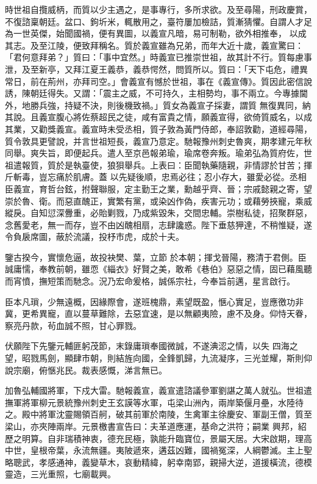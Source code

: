 \begin{pinyinscope}
 時世祖自攬威柄，而質以少主遇之，是事專行，多所求欲。及至尋陽，刑政慶賞，不復諮稟朝廷。盆口、鉤圻米，輒散用之，臺符屢加檢詰，質漸猜懼。自謂人才足為一世英傑，始聞國禍，便有異圖，以義宣凡暗，易可制勒，欲外相推奉，
 以成其志。及至江陵，便致拜稱名。質於義宣雖為兄弟，而年大近十歲，義宣驚曰：「君何意拜弟？」質曰：「事中宜然。」時義宣已推崇世祖，故其計不行。質每慮事泄，及至新亭，又拜江夏王義恭，義恭愕然，問質所以。質曰：「天下屯危，禮異常日，前在荊州，亦拜司空。」會義宣有憾於世祖，事在《義宣傳》。質因此密信說誘，陳朝廷得失。又謂：「震主之威，不可持久，主相勢均，事不兩立。今專據閫外，地勝兵強，持疑不決，則後機致禍。」質女為義宣子採妻，謂質
 無復異同，納其說。且義宣腹心將佐蔡超民之徒，咸有富貴之情，願義宣得，欲倚質威名，以成其業，又勸獎義宣。義宣時未受丞相，質子敦為黃門侍郎，奉詔敦勸，道經尋陽，質令敦具更譬說，并言世祖短長，義宣乃意定。馳報豫州刺史魯爽，期孝建元年秋同舉。爽失旨，即便起兵。遣人至京邑報弟瑜，瑜席卷奔叛。瑜弟弘為質府佐，世祖遣報質，質於是執臺使，狼狽舉兵。上表曰：臣聞執藥隨親，非情謬於甘苦；揮斤斬毒，豈忘痛於肌膚。蓋
 以先疑後順，忠焉必往；忍小存大，雖愛必從。丞相臣義宣，育哲台鉉，拊聲聯服，定主勤王之業，勳越乎齊、晉；宗戚懿親之寄，望崇於魯、衛。而惡直醜正，實繁有黨，或染凶作偽，疾害元功；或藉勞挾寵，乘威縱戾。自知愆深釁重，必貽剿戮，乃成紫毀朱，交間忠輔。崇樹私徒，招聚群惡，念舊愛老，無一而存，豈不由凶醜相扇，志肆讒惑。陛下垂慈狎達，不稍惟疑，遂令負扆席圖，蔽於流議，投杼市虎，成於十夫。



 鑒古揆今，實懷危逼，故投袂樊、葉，立節
 於本朝；揮戈晉陽，務清于君側。臣誠庸懦，奉教前朝，雖恧《緇衣》好賢之美，敢希《巷伯》惡惡之情，固已藉風聽而宵憤，撫短策而馳念。況乃宏命爰格，誠係宗社，今奉旨前邁，星言啟行。



 臣本凡瑣，少無遠概，因緣際會，遂班槐鼎，素望既盈，愜心實足，豈應徼功非冀，更希異寵，直以蔓草難除，去惡宜速，是以無顧夷險，慮不及身。仰恃天眷，察亮丹款，茍血誠不照，甘心罪戮。



 伏願陛下先鑒元輔匪躬茂節，末錄庸瑣奉國微誠，不遂淟涊之情，以失
 四海之望，昭戮馬劍，顯肆市朝，則結旌向國，全鋒凱歸，九流凝序，三光並耀，斯則仰說宗廟，俯愜兆民。裁表感慨，涕言無已。



 加魯弘輔國將軍，下戍大雷。馳報義宣，義宣遣諮議參軍劉諶之萬人就弘。世祖遣撫軍將軍柳元景統豫州刺史王玄謨等水軍，屯梁山洲內，兩岸築偃月壘，水陸待之。殿中將軍沈靈賜領百舸，破其前軍於南陵，生禽軍主徐慶安、軍副王僧，質至梁山，亦夾陣兩岸。元景檄書宣告曰：夫革道應運，基命之洪符；嗣業
 興邦，紹歷之明算。自非瑞積神衷，德充民極，孰能升臨寶位，景屬天居。大宋啟期，理高中世，皇根帝葉，永流無疆。夷陂遞來，遘茲凶難，國禍冤深，人綱鬱滅。主上聖略聰武，孝感通神，義變草木，哀動精緯，躬幸南郢，親掃大逆，道援橫流，德模靈造，三光重照，七廟載興。




\end{pinyinscope}

